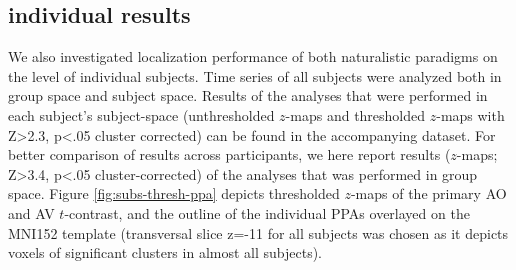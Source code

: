 \documentclass[english]{article}
\begin{document}
\subsection{individual results}


We also investigated localization performance of both naturalistic paradigms on
the level of individual subjects.
Time series of all subjects were analyzed both in group space and subject space.
Results of the analyses that were performed in each subject's subject-space
(unthresholded $z$-maps and thresholded $z$-maps with Z>2.3, p<.05 cluster
corrected) can be found in the accompanying dataset.
For better comparison of results across participants, we here report results
($z$-maps; Z>3.4, p<.05 cluster-corrected) of the analyses that was performed in
group space.
Figure \ref{fig:subs-thresh-ppa} depicts thresholded $z$-maps of the primary AO
and AV $t$-contrast, and the outline of the individual PPAs
\citep{sengupta2016extension} overlayed on the MNI152 template (transversal
slice z=-11 for all subjects was chosen as it depicts voxels of significant
clusters in almost all subjects).

\end{document}
